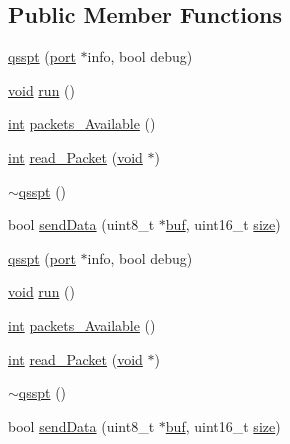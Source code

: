 \subsection*{Public Member Functions}
\begin{DoxyCompactItemize}
\item 
\hyperlink{classqsspt_gaa7e3f69818d5f701e1c7191059b332ae}{qsspt} (\hyperlink{classport}{port} $\ast$info, bool debug)
\item 
\hyperlink{group___u_a_v_objects_plugin_ga444cf2ff3f0ecbe028adce838d373f5c}{void} \hyperlink{classqsspt_gac7b338eecc56ca930c6078162b168c83}{run} ()
\item 
\hyperlink{ioapi_8h_a787fa3cf048117ba7123753c1e74fcd6}{int} \hyperlink{classqsspt_ga4fd481f6796cd770176f43ddc097ebe8}{packets\-\_\-\-Available} ()
\item 
\hyperlink{ioapi_8h_a787fa3cf048117ba7123753c1e74fcd6}{int} \hyperlink{classqsspt_gab8eb0ccb0806be7a169c335cab1e4d0c}{read\-\_\-\-Packet} (\hyperlink{group___u_a_v_objects_plugin_ga444cf2ff3f0ecbe028adce838d373f5c}{void} $\ast$)
\item 
\hyperlink{classqsspt_ga05f94a4538efa2bacd837e2b0684d6b3}{$\sim$qsspt} ()
\item 
bool \hyperlink{classqsspt_ga7711ea10887bffa2d338e45bfdd564a2}{send\-Data} (uint8\-\_\-t $\ast$\hyperlink{ioapi_8h_a8ad8a13c88886b9f623034ff88570adb}{buf}, uint16\-\_\-t \hyperlink{glext_8h_a014d89bd76f74ef3a29c8f04b473eb76}{size})
\item 
\hyperlink{group___uploader_gaa7e3f69818d5f701e1c7191059b332ae}{qsspt} (\hyperlink{classport}{port} $\ast$info, bool debug)
\item 
\hyperlink{group___u_a_v_objects_plugin_ga444cf2ff3f0ecbe028adce838d373f5c}{void} \hyperlink{group___uploader_gac7b338eecc56ca930c6078162b168c83}{run} ()
\item 
\hyperlink{ioapi_8h_a787fa3cf048117ba7123753c1e74fcd6}{int} \hyperlink{group___uploader_ga4fd481f6796cd770176f43ddc097ebe8}{packets\-\_\-\-Available} ()
\item 
\hyperlink{ioapi_8h_a787fa3cf048117ba7123753c1e74fcd6}{int} \hyperlink{group___uploader_gab8eb0ccb0806be7a169c335cab1e4d0c}{read\-\_\-\-Packet} (\hyperlink{group___u_a_v_objects_plugin_ga444cf2ff3f0ecbe028adce838d373f5c}{void} $\ast$)
\item 
\hyperlink{group___uploader_ga05f94a4538efa2bacd837e2b0684d6b3}{$\sim$qsspt} ()
\item 
bool \hyperlink{group___uploader_ga7711ea10887bffa2d338e45bfdd564a2}{send\-Data} (uint8\-\_\-t $\ast$\hyperlink{ioapi_8h_a8ad8a13c88886b9f623034ff88570adb}{buf}, uint16\-\_\-t \hyperlink{glext_8h_a014d89bd76f74ef3a29c8f04b473eb76}{size})
\end{DoxyCompactItemize}


